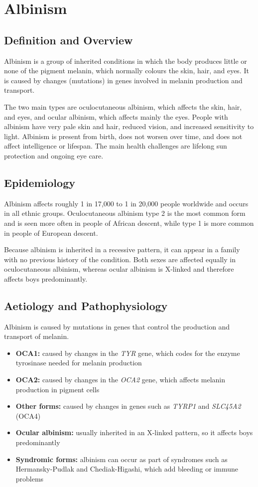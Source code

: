 \chapter{Albinism}

\section*{Definition and Overview}
Albinism is a group of inherited conditions in which the body produces little or none of the pigment melanin, which normally colours the skin, hair, and eyes. It is caused by changes (mutations) in genes involved in melanin production and transport.

The two main types are oculocutaneous albinism, which affects the skin, hair, and eyes, and ocular albinism, which affects mainly the eyes. People with albinism have very pale skin and hair, reduced vision, and increased sensitivity to light. Albinism is present from birth, does not worsen over time, and does not affect intelligence or lifespan. The main health challenges are lifelong sun protection and ongoing eye care.

\section*{Epidemiology}
Albinism affects roughly 1 in 17,000 to 1 in 20,000 people worldwide and occurs in all ethnic groups. Oculocutaneous albinism type 2 is the most common form and is seen more often in people of African descent, while type 1 is more common in people of European descent.

Because albinism is inherited in a recessive pattern, it can appear in a family with no previous history of the condition. Both sexes are affected equally in oculocutaneous albinism, whereas ocular albinism is X-linked and therefore affects boys predominantly.

\section*{Aetiology and Pathophysiology}
Albinism is caused by mutations in genes that control the production and transport of melanin.

\begin{itemize}
    \item \textbf{OCA1:} caused by changes in the \textit{TYR} gene, which codes for the enzyme tyrosinase needed for melanin production
    \item \textbf{OCA2:} caused by changes in the \textit{OCA2} gene, which affects melanin production in pigment cells
    \item \textbf{Other forms:} caused by changes in genes such as \textit{TYRP1} and \textit{SLC45A2} (OCA4)
    \item \textbf{Ocular albinism:} usually inherited in an X-linked pattern, so it affects boys predominantly
    \item \textbf{Syndromic forms:} albinism can occur as part of syndromes such as Hermansky-Pudlak and Chediak-Higashi, which add bleeding or immune problems
\end{itemize}

